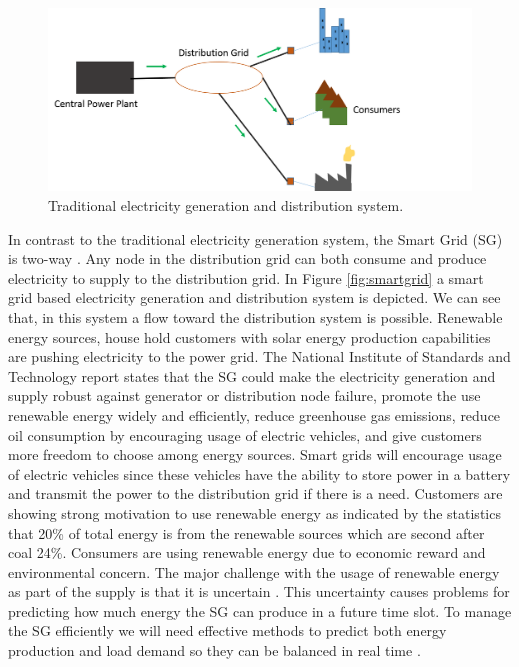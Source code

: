 \begin{figure}[h]
  \includegraphics[width=\linewidth]{traditional.png}
  \caption{Traditional electricity generation and distribution system.}
  \label{fig:tradgrid}
\end{figure}

In contrast to the traditional electricity generation system, the Smart Grid (SG) is two-way \cite{fang2012smart}. Any node in the distribution grid can both consume and produce electricity to supply to the distribution grid. In Figure \ref{fig:smartgrid} a smart grid based electricity generation and distribution system is depicted. We can see that, in this system a flow toward the distribution system is possible. Renewable energy sources, house hold customers with solar energy production capabilities are pushing electricity to the power grid. The National Institute of Standards and Technology report \cite{fang2012smart} states that the SG could make the electricity generation and supply robust against generator or distribution node failure, promote the use renewable energy widely and efficiently, reduce greenhouse gas emissions, reduce oil consumption by encouraging usage of electric vehicles, and give customers more freedom to choose among energy sources. Smart grids will encourage usage of electric vehicles since these vehicles have the ability to store power in a battery and transmit the power to the distribution grid if there is a need. Customers are showing strong motivation to use renewable energy as indicated by the statistics that 20\% of total energy is from the renewable sources which are second after coal 24\%. Consumers are using renewable energy due to economic reward and environmental concern. The major challenge with the usage of renewable energy as part of the supply is that it is uncertain \cite{richter2012transitioning}. This uncertainty causes problems for predicting how much energy the SG can produce in a future time slot. To manage the SG efficiently we will need effective methods to predict both energy production and load demand so they can be balanced in real time \cite{potter2009building}.

